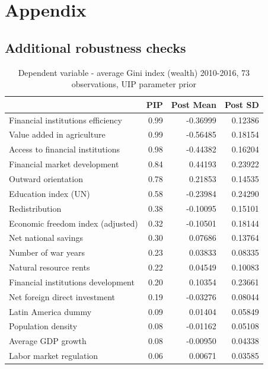 \begin{refsection}
\section*{Appendix}
\begin{subappendices}
    \section{Additional robustness checks}
    \label{ch3sec:app_rch}
    \begin{table}[!ht]
    \footnotesize
    \centering
    \caption{Dependent variable - average Gini index (wealth) 2010-2016, 73 observations, \ac{UIP} parameter prior}
    \label{ch3table:res2}
    \begin{tabular}{lrrr}
      \toprule
     & \ac{PIP} & Post Mean & Post SD \\ 
      \midrule
      Financial institutions efficiency & 0.99 & -0.36999 & 0.12386 \\ 
      Value added in agriculture & 0.99 & -0.56485 & 0.18154 \\ 
      Access to financial institutions & 0.98 & -0.44382 & 0.16204 \\ 
      Financial market development & 0.84 & 0.44193 & 0.23922 \\ 
      Outward orientation & 0.78 & 0.21853 & 0.14535 \\ 
      Education index (UN) & 0.58 & -0.23984 & 0.24290 \\ 
      Redistribution & 0.38 & -0.10095 & 0.15101 \\ 
      Economic freedom index (adjusted) & 0.32 & -0.10501 & 0.18144 \\ 
      Net national savings & 0.30 & 0.07686 & 0.13764 \\ 
      Number of war years & 0.23 & 0.03833 & 0.08335 \\ 
      Natural resource rents & 0.22 & 0.04549 & 0.10083 \\ 
      Financial institutions development & 0.20 & 0.10354 & 0.23661 \\ 
      Net foreign direct investment & 0.19 & -0.03276 & 0.08044 \\ 
      Latin America dummy & 0.09 & 0.01404 & 0.05849 \\ 
      Population density & 0.08 & -0.01162 & 0.05108 \\ 
      Average GDP growth & 0.08 & -0.00950 & 0.04338 \\ 
      Labor market regulation & 0.06 & 0.00671 & 0.03585 \\ 

\end{tabular}
\end{table}
\end{subappendices}
\end{refsection}
